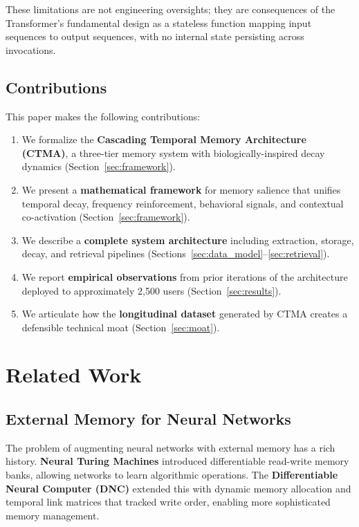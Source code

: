 \documentclass[11pt,a4paper]{article}
\begin{document}
These limitations are not engineering oversights; they are consequences of the Transformer's fundamental design as a stateless function mapping input sequences to output sequences, with no internal state persisting across invocations.

\subsection{Contributions}

This paper makes the following contributions:

\begin{enumerate}[label=(\arabic*)]
  \item We formalize the \textbf{Cascading Temporal Memory Architecture (CTMA)}, a three-tier memory system with biologically-inspired decay dynamics (Section~\ref{sec:framework}).
  \item We present a \textbf{mathematical framework} for memory salience that unifies temporal decay, frequency reinforcement, behavioral signals, and contextual co-activation (Section~\ref{sec:framework}).
  \item We describe a \textbf{complete system architecture} including extraction, storage, decay, and retrieval pipelines (Sections~\ref{sec:data_model}--\ref{sec:retrieval}).
  \item We report \textbf{empirical observations} from prior iterations of the architecture deployed to approximately 2,500 users (Section~\ref{sec:results}).
  \item We articulate how the \textbf{longitudinal dataset} generated by CTMA creates a defensible technical moat (Section~\ref{sec:moat}).
\end{enumerate}


\section{Related Work}
\label{sec:related}

\subsection{External Memory for Neural Networks}

The problem of augmenting neural networks with external memory has a rich history. \textbf{Neural Turing Machines} \citep{graves2014neural} introduced differentiable read-write memory banks, allowing networks to learn algorithmic operations. The \textbf{Differentiable Neural Computer (DNC)} \citep{graves2016hybrid} extended this with dynamic memory allocation and temporal link matrices that tracked write order, enabling more sophisticated memory management.
\end{document}
